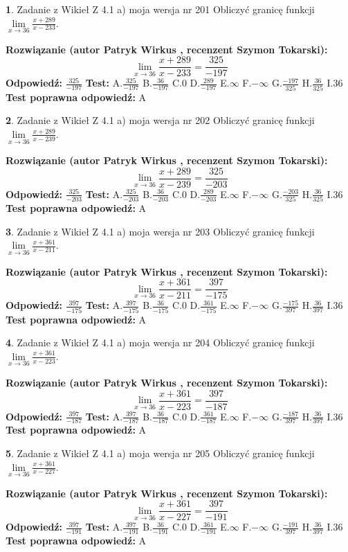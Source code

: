\documentclass[12pt, a4paper]{article}
\theoremstyle{definition} %
\newtheorem{zad}{}
\newcommand{\zadStart}[1]{\begin{zad}#1\newline}
\newcommand{\zadStop}{\end{zad}}
\newcommand{\rozwStart}[2]{\noindent \textbf{Rozwiązanie (autor #1 , recenzent #2): }\newline}
\newcommand{\rozwStop}{\newline}
\newcommand{\odpStart}{\noindent \textbf{Odpowiedź:}\newline}
\newcommand{\odpStop}{\newline}
\newcommand{\testStart}{\noindent \textbf{Test:}\newline}
\newcommand{\testStop}{\newline}
\newcommand{\kluczStart}{\noindent \textbf{Test poprawna odpowiedź:}\newline}
\newcommand{\kluczStop}{\newline}
\begin{document}
\zadStart{Zadanie z Wikieł Z 4.1 a) moja wersja nr 201}
Obliczyć granicę funkcji $\lim\limits_{x\to36}\frac{x+289}{x-233}$.
\zadStop
\rozwStart{Patryk Wirkus}{Szymon Tokarski}
$$\lim\limits_{x\to36}\frac{x+289}{x-233} = \frac{325}{-197}$$
\rozwStop
\odpStart
$\frac{325}{-197}$
\odpStop
\testStart
A.$\frac{325}{-197}$
B.$\frac{36}{-197}$
C.$0$
D.$\frac{289}{-197}$
E.$\infty$
F.$-\infty$
G.$\frac{-197}{325}$
H.$\frac{36}{325}$
I.$36$
\testStop
\kluczStart
A
\kluczStop



\zadStart{Zadanie z Wikieł Z 4.1 a) moja wersja nr 202}
Obliczyć granicę funkcji $\lim\limits_{x\to36}\frac{x+289}{x-239}$.
\zadStop
\rozwStart{Patryk Wirkus}{Szymon Tokarski}
$$\lim\limits_{x\to36}\frac{x+289}{x-239} = \frac{325}{-203}$$
\rozwStop
\odpStart
$\frac{325}{-203}$
\odpStop
\testStart
A.$\frac{325}{-203}$
B.$\frac{36}{-203}$
C.$0$
D.$\frac{289}{-203}$
E.$\infty$
F.$-\infty$
G.$\frac{-203}{325}$
H.$\frac{36}{325}$
I.$36$
\testStop
\kluczStart
A
\kluczStop



\zadStart{Zadanie z Wikieł Z 4.1 a) moja wersja nr 203}
Obliczyć granicę funkcji $\lim\limits_{x\to36}\frac{x+361}{x-211}$.
\zadStop
\rozwStart{Patryk Wirkus}{Szymon Tokarski}
$$\lim\limits_{x\to36}\frac{x+361}{x-211} = \frac{397}{-175}$$
\rozwStop
\odpStart
$\frac{397}{-175}$
\odpStop
\testStart
A.$\frac{397}{-175}$
B.$\frac{36}{-175}$
C.$0$
D.$\frac{361}{-175}$
E.$\infty$
F.$-\infty$
G.$\frac{-175}{397}$
H.$\frac{36}{397}$
I.$36$
\testStop
\kluczStart
A
\kluczStop



\zadStart{Zadanie z Wikieł Z 4.1 a) moja wersja nr 204}
Obliczyć granicę funkcji $\lim\limits_{x\to36}\frac{x+361}{x-223}$.
\zadStop
\rozwStart{Patryk Wirkus}{Szymon Tokarski}
$$\lim\limits_{x\to36}\frac{x+361}{x-223} = \frac{397}{-187}$$
\rozwStop
\odpStart
$\frac{397}{-187}$
\odpStop
\testStart
A.$\frac{397}{-187}$
B.$\frac{36}{-187}$
C.$0$
D.$\frac{361}{-187}$
E.$\infty$
F.$-\infty$
G.$\frac{-187}{397}$
H.$\frac{36}{397}$
I.$36$
\testStop
\kluczStart
A
\kluczStop



\zadStart{Zadanie z Wikieł Z 4.1 a) moja wersja nr 205}
Obliczyć granicę funkcji $\lim\limits_{x\to36}\frac{x+361}{x-227}$.
\zadStop
\rozwStart{Patryk Wirkus}{Szymon Tokarski}
$$\lim\limits_{x\to36}\frac{x+361}{x-227} = \frac{397}{-191}$$
\rozwStop
\odpStart
$\frac{397}{-191}$
\odpStop
\testStart
A.$\frac{397}{-191}$
B.$\frac{36}{-191}$
C.$0$
D.$\frac{361}{-191}$
E.$\infty$
F.$-\infty$
G.$\frac{-191}{397}$
H.$\frac{36}{397}$
I.$36$
\testStop
\kluczStart
A
\kluczStop
\end{document}
